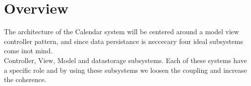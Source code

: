 \section{Overview}
The architecture of the Calendar system will be centered around a model view controller pattern, and since data persistance is neccecary four ideal subsystems come inot mind.\\
Controller, View, Model and datastorage subsystems. Each of these systems have a specific role and by using these subsystems we loosen the coupling and increase the coherence.